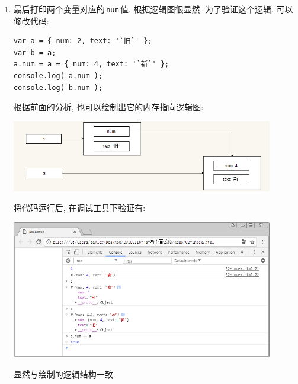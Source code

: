\documentclass[UTF8, noindent]{ctexart}
\begin{document}
\begin{enumerate}
\begin{enumerate}
    \end{enumerate}

\item 最后打印两个变量对应的\,\lstinline|num|\,值, 根据逻辑图很显然. 为了验证这个逻辑, 可以修改代码:

\begin{lstlisting}
var a = { num: 2, text: '`旧`' };
var b = a;
a.num = a = { num: 4, text: '`新`' };
console.log( a.num );
console.log( b.num );
\end{lstlisting}

      根据前面的分析, 也可以绘制出它的内存指向逻辑图:
      
{\noindent\centering\includegraphics[width=0.9\textwidth]{imgs/2018-01-16_172956.png}}

      将代码运行后, 在调试工具下验证有:

{\noindent\centering\includegraphics[width=0.9\textwidth]{imgs/2018-01-16_173153.png}}

      显然与绘制的逻辑结构一致.

\end{enumerate}
\end{document}
